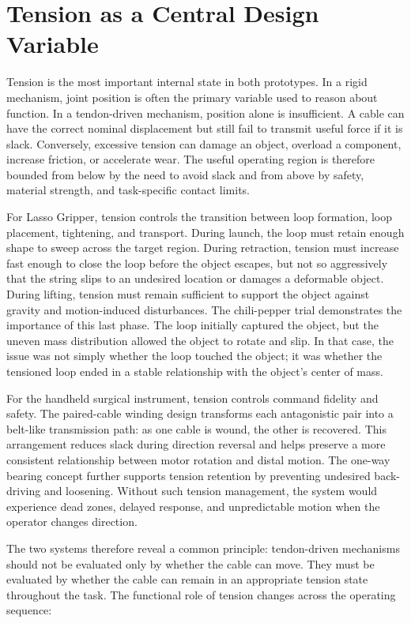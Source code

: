 \section{Tension as a Central Design Variable}

Tension is the most important internal state in both prototypes. In a rigid mechanism, joint position is often the primary variable used to reason about function. In a tendon-driven mechanism, position alone is insufficient. A cable can have the correct nominal displacement but still fail to transmit useful force if it is slack. Conversely, excessive tension can damage an object, overload a component, increase friction, or accelerate wear. The useful operating region is therefore bounded from below by the need to avoid slack and from above by safety, material strength, and task-specific contact limits.

For Lasso Gripper, tension controls the transition between loop formation, loop placement, tightening, and transport. During launch, the loop must retain enough shape to sweep across the target region. During retraction, tension must increase fast enough to close the loop before the object escapes, but not so aggressively that the string slips to an undesired location or damages a deformable object. During lifting, tension must remain sufficient to support the object against gravity and motion-induced disturbances. The chili-pepper trial demonstrates the importance of this last phase. The loop initially captured the object, but the uneven mass distribution allowed the object to rotate and slip. In that case, the issue was not simply whether the loop touched the object; it was whether the tensioned loop ended in a stable relationship with the object's center of mass.

For the handheld surgical instrument, tension controls command fidelity and safety. The paired-cable winding design transforms each antagonistic pair into a belt-like transmission path: as one cable is wound, the other is recovered. This arrangement reduces slack during direction reversal and helps preserve a more consistent relationship between motor rotation and distal motion. The one-way bearing concept further supports tension retention by preventing undesired back-driving and loosening. Without such tension management, the system would experience dead zones, delayed response, and unpredictable motion when the operator changes direction.

The two systems therefore reveal a common principle: tendon-driven mechanisms should not be evaluated only by whether the cable can move. They must be evaluated by whether the cable can remain in an appropriate tension state throughout the task. The functional role of tension changes across the operating sequence:

